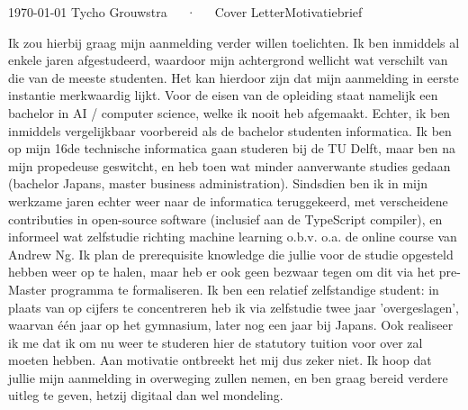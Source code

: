 \documentclass[11pt, a4paper]{awesome-cv}
\newcommand{\langen}[1]{\ifen#1\fi}
\newcommand{\langnl}[1]{\ifnl#1\fi}
\begin{document}
    \langen{}
    \langnl{}
    \makecvheader[R]
    \makecvfooter
      {\today}
      {Tycho Grouwstra~~~·~~~\langen{Cover Letter}\langnl{Motivatiebrief}}
      {}
    \makelettertitle
    
    \begin{cvletter}
    
    Ik zou hierbij graag mijn aanmelding verder willen toelichten.
    Ik ben inmiddels al enkele jaren afgestudeerd, waardoor mijn achtergrond wellicht wat verschilt van die van de meeste studenten.
    Het kan hierdoor zijn dat mijn aanmelding in eerste instantie merkwaardig lijkt.
    \newline\newline
    Voor de eisen van de opleiding staat namelijk een bachelor in AI / computer science, welke ik nooit heb afgemaakt.
    Echter, ik ben inmiddels vergelijkbaar voorbereid als de bachelor studenten informatica.
    \newline\newline
    Ik ben op mijn 16de technische informatica gaan studeren bij de TU Delft, maar ben na mijn propedeuse geswitcht,
    en heb toen wat minder aanverwante studies gedaan (bachelor Japans, master business administration).
    \newline\newline
    Sindsdien ben ik in mijn werkzame jaren echter weer naar de informatica teruggekeerd,
    met verscheidene contributies in open-source software (inclusief aan de TypeScript compiler),
    en informeel wat zelfstudie richting machine learning o.b.v. o.a. de online course van Andrew Ng.
    \newline\newline
    Ik plan de prerequisite knowledge die jullie voor de studie opgesteld hebben weer op te halen,
    maar heb er ook geen bezwaar tegen om dit via het pre-Master programma te formaliseren.
    \newline\newline
    Ik ben een relatief zelfstandige student:
    in plaats van op cijfers te concentreren heb ik via zelfstudie twee jaar
    'overgeslagen', waarvan één jaar op het gymnasium, later nog een jaar bij Japans.
    Ook realiseer ik me dat ik om nu weer te studeren hier de statutory tuition voor over zal moeten hebben.
    Aan motivatie ontbreekt het mij dus zeker niet.
    \newline\newline
    Ik hoop dat jullie mijn aanmelding in overweging zullen nemen,
    en ben graag bereid verdere uitleg te geven, hetzij digitaal dan wel mondeling.
    
    \end{cvletter}
    \makeletterclosing
    
\end{document}
